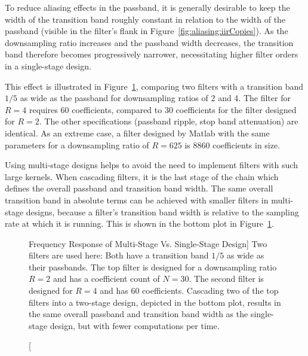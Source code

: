 To  reduce  aliasing  effects  in  the passband,  it  is  generally  desirable
to  keep  the width  of  the  transition  band  roughly constant  in  relation
to  the   width  of   the  passband   (visible  in   the  filter's   flank  in
Figure~\ref{fig:aliasing:iirCopies}).   As  the downsampling  ratio  increases
and  the  passband width  decreases,  the  transition band  therefore  becomes
progressively narrower,  necessitating higher filter orders  in a single-stage
design.

This   effect  is   illustrated  in   Figure~\ref{fig:fdesign:tbw_width_Rvar},
comparing two filters with a transition band $1/5$ as wide as the passband for
downsampling  ratios of  \num{2} and  \num{4}. The filter  for $R=4$  requires
\num{60}  coefficients,  compared  to  \num{30} coefficients  for  the  filter
designed  for $R=2$.   The other  specifications (passband  ripple, stop  band
attenuation) are identical.   As an extreme case, a filter  designed by Matlab
with the  same parameters for  a downsampling  ratio of $R=625$  is \num{8860}
coefficients in size.

Using multi-stage  designs helps to avoid  the need to implement  filters with
such large kernels.  When cascading filters, it is the last stage of the chain
which defines the overall passband and transition band width. The same overall
transition band  in absolute  terms can  be achieved  with smaller  filters in
multi-stage designs, because  a filter's transition band width  is relative to
the sampling rate at which it is running.  This is shown in the bottom plot in
Figure~\ref{fig:fdesign:tbw_width_Rvar}.

\begin{figure}
    \centering
    
    \caption
        [Frequency Response of Multi-Stage Vs. Single-Stage Design]{%
        Two filters are  used here: Both have a transition band  $1/5$ as wide
        as  their passbands. The  top filter  is designed  for a  downsampling
        ratio $R=2$ and  has a coefficient count of  $N=30$. The second filter
        is designed for $R=4$ and  has \num{60} coefficients. Cascading two of
        the top filters into a two-stage  design, depicted in the bottom plot,
        results in the same overall passband  and transition band width as the
        single-stage design, but with fewer computations per time.%
    }
    \label{fig:fdesign:tbw_width_Rvar}
\end{figure}

